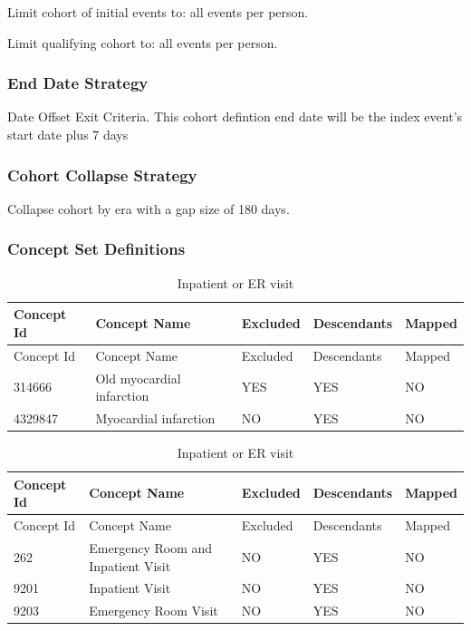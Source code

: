 \documentclass[11pt]{book}
\theoremstyle{definition}
\theoremstyle{definition}
\theoremstyle{definition}
\theoremstyle{remark}
\begin{document}
Limit cohort of initial events to: all events per person.

Limit qualifying cohort to: all events per person.

\hypertarget{end-date-strategy-2}{%
\subsubsection*{End Date Strategy}\label{end-date-strategy-2}}

Date Offset Exit Criteria.
This cohort defintion end date will be the index event's start date plus 7 days

\hypertarget{cohort-collapse-strategy-2}{%
\subsubsection*{Cohort Collapse Strategy}\label{cohort-collapse-strategy-2}}

Collapse cohort by era with a gap size of 180 days.

\hypertarget{concept-set-definitions-2}{%
\subsubsection*{Concept Set Definitions}\label{concept-set-definitions-2}}

\begin{longtable}[]{@{}lllll@{}}
\caption{\label{tab:ami} Inpatient or ER visit}\tabularnewline
\toprule
Concept Id & Concept Name & Excluded & Descendants & Mapped\tabularnewline
\midrule
\endfirsthead
\toprule
Concept Id & Concept Name & Excluded & Descendants & Mapped\tabularnewline
\midrule
\endhead
314666 & Old myocardial infarction & YES & YES & NO\tabularnewline
4329847 & Myocardial infarction & NO & YES & NO\tabularnewline
\bottomrule
\end{longtable}

\begin{longtable}[]{@{}lllll@{}}
\caption{\label{tab:inpatientOrErAmi} Inpatient or ER visit}\tabularnewline
\toprule
Concept Id & Concept Name & Excluded & Descendants & Mapped\tabularnewline
\midrule
\endfirsthead
\toprule
Concept Id & Concept Name & Excluded & Descendants & Mapped\tabularnewline
\midrule
\endhead
262 & Emergency Room and Inpatient Visit & NO & YES & NO\tabularnewline
9201 & Inpatient Visit & NO & YES & NO\tabularnewline
9203 & Emergency Room Visit & NO & YES & NO\tabularnewline
\bottomrule
\end{longtable}
\end{document}

